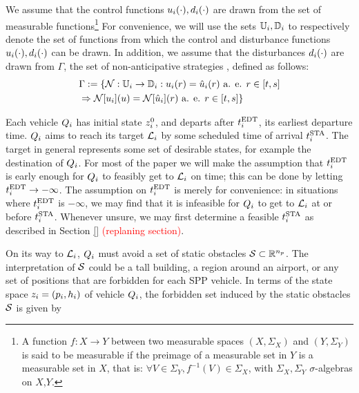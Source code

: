 We assume that the control functions $u_i(\cdot), d_i(\cdot)$ are drawn from the set of measurable functions\footnote{
A function $f:X\to Y$ between two measurable spaces $(X,\Sigma_X)$ and $(Y,\Sigma_Y)$ is said to be measurable if the preimage of a measurable set in $Y$ is a measurable set in $X$, that is: $\forall V\in\Sigma_Y, f^{-1}(V)\in\Sigma_X$, with $\Sigma_X,\Sigma_Y$ $\sigma$-algebras on $X$,$Y$.} For convenience, we will use the sets $\mathbb{U}_i, \mathbb{D}_i$ to respectively denote the set of functions from which the control and disturbance functions $u_i(\cdot), d_i(\cdot)$ can be drawn. In addition, we assume that the disturbances $d_i(\cdot)$ are drawn from $\Gamma$, the set of non-anticipative strategies \cite{Mitchell05}, defined as follows:
\begin{equation}
\begin{aligned}
& \Gamma := \{\mathcal{N}: \mathbb{U}_i \rightarrow \mathbb{D}_i:  u_i(r) = \hat{u}_i(r) \text{ a. e. } r\in[t,s] \\
& \Rightarrow \mathcal{N}[u_i](u) = \mathcal{N}[\hat{u}_i](r) \text{ a. e. } r\in[t,s]\}
\end{aligned}
\end{equation}

Each vehicle $Q_i$ has initial state $z^0_i$, and departs after $t^\text{EDT}_i$, its earliest departure time. $Q_i$ aims to reach its target $\mathcal{L}_i$ by some scheduled time of arrival $t^\text{STA}_i$. The target in general represents some set of desirable states, for example the destination of $Q_i$. For most of the paper we will make the assumption that $t^\text{EDT}_i$ is early enough for $Q_i$ to feasibly get to $\mathcal{L}_i$ on time; this can be done by letting $t^\text{EDT}_i \rightarrow -\infty$. The assumption on $t^\text{EDT}_i$ is merely for convenience: in situations where $t^\text{EDT}_i$ is $-\infty$, we may find that it is infeasible for $Q_i$ to get to $\mathcal{L}_i$ at or before $t^\text{STA}_i$. Whenever unsure, we may first determine a feasible $t^\text{STA}_i$ as described in Section \ref{} \textcolor{red}{(replaning section)}. 

On its way to $\mathcal{L}_i$, $Q_i$ must avoid a set of static obstacles $\mathcal{S} \subset \mathbb{R}^{n_p}$. The interpretation of $\mathcal{S}$ could be a tall building, a region around an airport, or any set of positions that are forbidden for each SPP vehicle. In terms of the state space $z_i = (p_i, h_i)$ of vehicle $Q_i$, the forbidden set induced by the static obstacles $\mathcal{S}$ is given by


